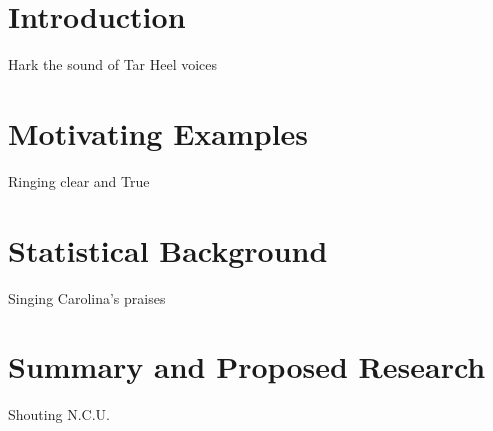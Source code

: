 

\section{Introduction}\label{sec:Introduce}

Hark the sound of Tar Heel voices

\section{Motivating Examples} \label{sec:MotivatingExamples}

Ringing clear and True

\section{Statistical Background}

Singing Carolina's praises

\section{Summary and Proposed Research}\label{sec:ProposedResearch}

Shouting N.C.U.

